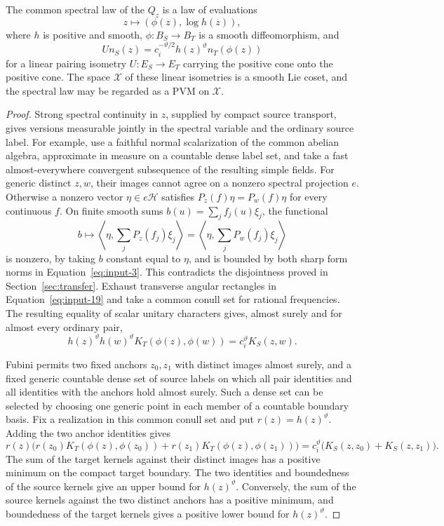 \begin{lemma}
\label{lem:locality-cone-maps}
The common spectral law of the $Q_z$ is a law of evaluations
\[
 z\longmapsto (\phi(z),\log h(z)),
\]
where $h$ is positive and smooth, $\phi:B_S\to B_T$ is a smooth
diffeomorphism, and
\begin{equation}
 U n_S(z)=c_i^{-\vartheta/2}h(z)^\vartheta n_T(\phi(z))
 \label{eq:locality-cone-isometry}
\end{equation}
for a linear pairing isometry $U:E_S\to E_T$ carrying the positive
cone onto the positive cone.  The space $\mathcal X$ of these
linear isometries is a smooth Lie coset, and the spectral law may
be regarded as a PVM on $\mathcal X$.
\end{lemma}

\begin{proof}
Strong spectral continuity in $z$, supplied by compact source transport,
gives versions measurable jointly in the spectral variable and the ordinary source label.
For example, use a faithful normal scalarization of the common
abelian algebra, approximate in measure on a countable dense label
set, and take a fast almost-everywhere convergent subsequence of
the resulting simple fields.  For generic distinct $z,w$, their
images cannot agree on a nonzero spectral projection $e$. Otherwise a
nonzero vector $\eta\in e\mathcal H$ satisfies
$P_z(f)\eta=P_w(f)\eta$ for every continuous $f$. On finite smooth sums
$b(u)=\sum_j f_j(u)\xi_j$, the functional
\[
 b\longmapsto\left\langle\eta,\sum_jP_z(f_j)\xi_j\right\rangle
     =\left\langle\eta,\sum_jP_w(f_j)\xi_j\right\rangle
\]
is nonzero, by taking $b$ constant equal to $\eta$, and is bounded by
both sharp form norms in Equation~\eqref{eq:input-3}. This contradicts
the disjointness proved in Section~\ref{sec:transfer}. Exhaust transverse
angular rectangles in Equation~\eqref{eq:input-19} and take a common
conull set for rational frequencies. The resulting equality of scalar
unitary characters gives, almost surely and for almost every ordinary pair,
\begin{equation}
 h(z)^\vartheta h(w)^\vartheta
 K_T(\phi(z),\phi(w))=c_i^\vartheta K_S(z,w).
 \label{eq:locality-classical-pairing}
\end{equation}

Fubini permits two fixed anchors $z_0,z_1$ with distinct images almost
surely, and a fixed generic countable dense set of source labels on which
all pair identities and all identities with the anchors hold almost
surely. Such a dense set can be selected by choosing one generic point
in each member of a countable boundary basis. Fix a realization in this
common conull set and put $r(z)=h(z)^\vartheta$. Adding the two anchor
identities gives
\[
 r(z)\big(r(z_0)K_T(\phi(z),\phi(z_0))
          +r(z_1)K_T(\phi(z),\phi(z_1))\big)
 =c_i^\vartheta\big(K_S(z,z_0)+K_S(z,z_1)\big).
\]
The sum of the target kernels against their distinct images has a positive
minimum on the compact target boundary.  The two identities and
boundedness of the source kernels give an upper bound for
$h(z)^\vartheta$.  Conversely, the sum of the source kernels
against the two distinct anchors has a positive minimum, and
boundedness of the target kernels gives a positive lower bound for
$h(z)^\vartheta$.


\end{proof}
